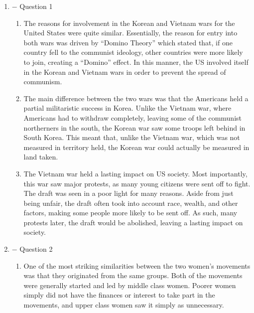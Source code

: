 \documentclass[12pt]{article}
\begin{document}
\begin{enumerate}

  \item $-$ Question 1

    \begin{enumerate}

      \item The reasons for involvement in the Korean and Vietnam wars for the United States were quite similar. Essentially, the reason for entry into both wars was driven by “Domino Theory” which stated that, if one country fell to the communist ideology, other countries were more likely to join, creating a “Domino” effect. In this manner, the US involved itself in the Korean and Vietnam wars in order to prevent the spread of communism.

      \item The main difference between the two wars was that the Americans held a partial militaristic success in Korea. Unlike the Vietnam war, where Americans had to withdraw completely, leaving some of the communist northerners in the south, the Korean war saw some troops left behind in South Korea. This meant that, unlike the Vietnam war, which was not measured in territory held, the Korean war could actually be measured in land taken.

      \item The Vietnam war held a lasting impact on US society. Most importantly, this war saw major protests, as many young citizens were sent off to fight. The draft was seen in a poor light for many reasons. Aside from just being unfair, the draft often took into account race, wealth, and other factors, making some people more likely to be sent off. As such, many protests later, the draft would be abolished, leaving a lasting impact on society.

    \end{enumerate}

    \newpage

  \item $-$ Question 2

    \begin{enumerate}

      \item One of the most striking similarities between the two women's movements was that they originated from the same groups. Both of the movements were generally started and led by middle class women. Poorer women simply did not have the finances or interest to take part in the movements, and upper class women saw it simply as unnecessary.


\end{enumerate}
\end{enumerate}
\end{document}
